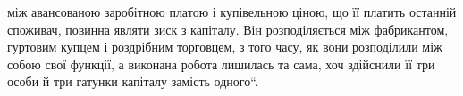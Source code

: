 \parcont{}  %
між авансованою заробітною платою і купівельною ціною, що її платить
останній споживач, повинна являти зиск з капіталу. Він розподіляється
між фабрикантом, гуртовим купцем і роздрібним торговцем, з того часу,
як вони розподілили між собою свої функції, а виконана робота лишилась
та сама, хоч здійснили її три особи й три гатунки капіталу
замість одного“.


